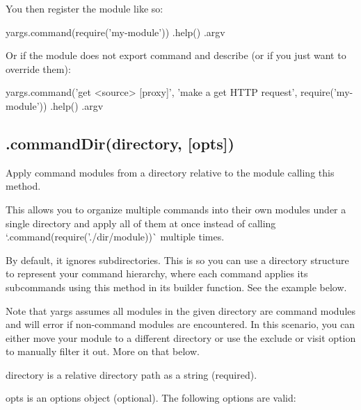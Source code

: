 You then register the module like so\+:


\begin{DoxyCode}
yargs.command(require('my-module'))
  .help()
  .argv
\end{DoxyCode}


Or if the module does not export {\ttfamily command} and {\ttfamily describe} (or if you just want to override them)\+:


\begin{DoxyCode}
yargs.command('get <source> [proxy]', 'make a get HTTP request', require('my-module'))
  .help()
  .argv
\end{DoxyCode}


\subsection*{.command\+Dir(directory, \mbox{[}opts\mbox{]}) }

Apply command modules from a directory relative to the module calling this method.

This allows you to organize multiple commands into their own modules under a single directory and apply all of them at once instead of calling `.command(require('./dir/module\textquotesingle{}))\`{} multiple times.

By default, it ignores subdirectories. This is so you can use a directory structure to represent your command hierarchy, where each command applies its subcommands using this method in its builder function. See the example below.

Note that yargs assumes all modules in the given directory are command modules and will error if non-\/command modules are encountered. In this scenario, you can either move your module to a different directory or use the {\ttfamily exclude} or {\ttfamily visit} option to manually filter it out. More on that below.

{\ttfamily directory} is a relative directory path as a string (required).

{\ttfamily opts} is an options object (optional). The following options are valid\+:


